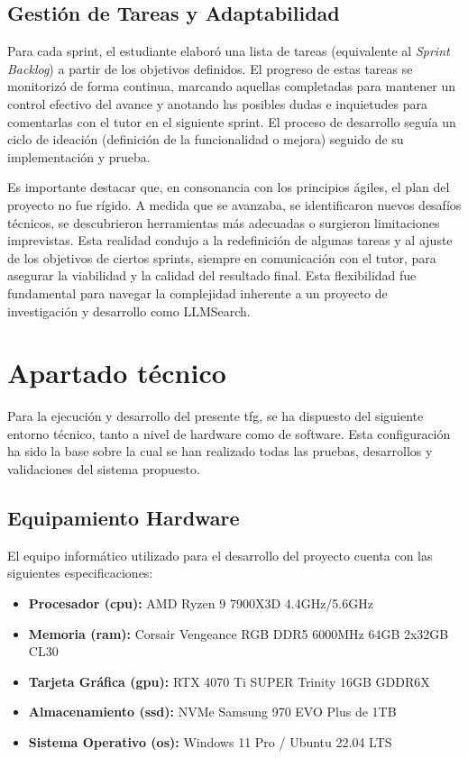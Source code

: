 \subsection{Gestión de Tareas y Adaptabilidad}
\label{subsec:gestion_tareas}

Para cada sprint, el estudiante elaboró una lista de tareas (equivalente al \textit{Sprint Backlog}) a partir de los objetivos definidos. El progreso de estas tareas se monitorizó de forma continua, marcando aquellas completadas para mantener un control efectivo del avance y anotando las posibles dudas e inquietudes para comentarlas con el tutor en el siguiente sprint. El proceso de desarrollo seguía un ciclo de ideación (definición de la funcionalidad o mejora) seguido de su implementación y prueba.

Es importante destacar que, en consonancia con los principios ágiles, el plan del proyecto no fue rígido. A medida que se avanzaba, se identificaron nuevos desafíos técnicos, se descubrieron herramientas más adecuadas o surgieron limitaciones imprevistas. Esta realidad condujo a la redefinición de algunas tareas y al ajuste de los objetivos de ciertos sprints, siempre en comunicación con el tutor, para asegurar la viabilidad y la calidad del resultado final. Esta flexibilidad fue fundamental para navegar la complejidad inherente a un proyecto de investigación y desarrollo como LLMSearch.

\section{Apartado técnico}
\label{sec:apartado_tecnico}

Para la ejecución y desarrollo del presente \gls{tfg}, se ha dispuesto del siguiente entorno técnico, tanto a nivel de hardware como de software. Esta configuración ha sido la base sobre la cual se han realizado todas las pruebas, desarrollos y validaciones del sistema propuesto.

\subsection{Equipamiento Hardware}
El equipo informático utilizado para el desarrollo del proyecto cuenta con las siguientes especificaciones:
\begin{itemize}
    \item \textbf{Procesador (\gls{cpu}):} AMD Ryzen 9 7900X3D 4.4GHz/5.6GHz
    \item \textbf{Memoria (\gls{ram}):} Corsair Vengeance RGB DDR5 6000MHz 64GB 2x32GB CL30
    \item \textbf{Tarjeta Gráfica (\gls{gpu}):} RTX 4070 Ti SUPER Trinity 16GB GDDR6X
    \item \textbf{Almacenamiento (\gls{ssd}):} NVMe Samsung 970 EVO Plus de 1TB
    \item \textbf{Sistema Operativo (\gls{os}):} Windows 11 Pro / Ubuntu 22.04 LTS
\end{itemize}

